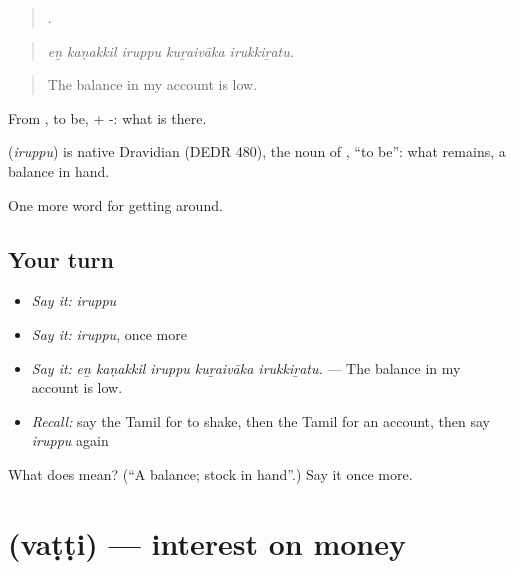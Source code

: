 \begin{quote}
    .
\end{quote}

\begin{quote}
\emph{eṉ kaṇakkil iruppu kuṟaivāka irukkiṟatu.}
\end{quote}

\begin{quote}
The balance in my account is low.
\end{quote}

From , to be, + -: what is there.

\begin{cousinweb}
\textbf{} (\emph{iruppu}) is native Dravidian (DEDR 480), the noun of , \textquotedblleft{}to be\textquotedblright{}: what remains, a balance in hand.
\end{cousinweb}

\begin{grammarlens}[title={What you've built}]
One more word for getting around.
\end{grammarlens}

\subsection*{Your turn}
\begin{itemize}
\raggedright
  \item \emph{Say it:} \emph{iruppu}
  \item \emph{Say it:} \emph{iruppu}, once more
  \item \emph{Say it:} \emph{eṉ kaṇakkil iruppu kuṟaivāka irukkiṟatu.} — The balance in my account is low.
  \item \emph{Recall:} say the Tamil for to shake, then the Tamil for an account, then say \emph{iruppu} again
\end{itemize}

\begin{tcolorbox}[breakable,colback=teal!4,colframe=teal!35!black,title={Before you move on}]
What does  mean? (\textquotedblleft{}A balance; stock in hand\textquotedblright{}.) Say it once more.
\end{tcolorbox}
\section[\texorpdfstring{\ta{வட்டி} (vaṭṭi)}{வட்டி (vaṭṭi)}]{ (vaṭṭi) — interest on money}

